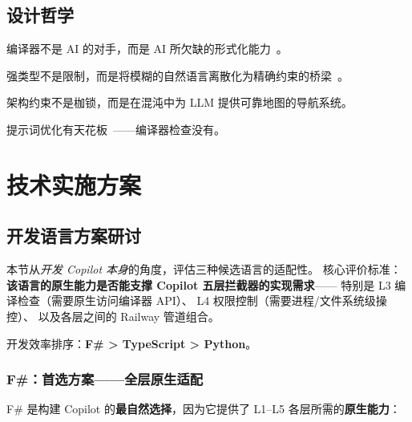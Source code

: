 \documentclass[10pt, openany]{book}
\begin{document}
\section{设计哲学}

\begin{framed}
\centering
\large 编译器不是 AI 的对手，而是 AI 所欠缺的形式化能力~\cite{Aho2006Compilers}。

强类型不是限制，而是将模糊的自然语言离散化为精确约束的桥梁~\cite{Pierce2002TAPL}。

架构约束不是枷锁，而是在混沌中为 LLM 提供可靠地图的导航系统。

\vspace{0.5em}
提示词优化有天花板~\cite{Liu2023LostInMiddle}——编译器检查没有。
\end{framed}

\chapter{技术实施方案}

\section{开发语言方案研讨}

本节从\emph{开发 Copilot 本身}的角度，评估三种候选语言的适配性。
核心评价标准：\textbf{该语言的原生能力是否能支撑 Copilot 五层拦截器的实现需求}——
特别是 L3 编译检查（需要原生访问编译器 API）、
L4 权限控制（需要进程/文件系统级操控）、
以及各层之间的 Railway 管道组合。

开发效率排序：\textbf{F\# > TypeScript > Python}。

\subsection{F\#：首选方案——全层原生适配}

F\# 是构建 Copilot 的\textbf{最自然选择}，因为它提供了 L1--L5 各层所需的\textbf{原生能力}：
\end{document}
